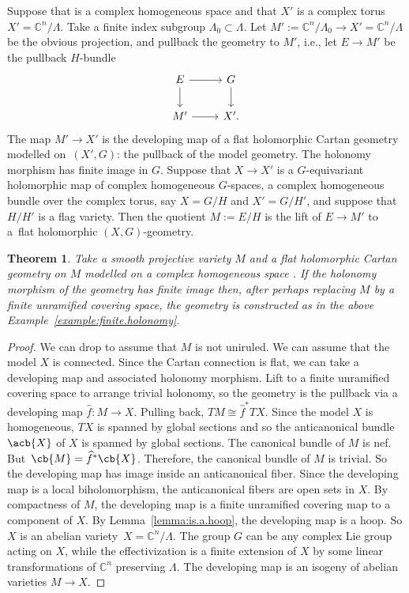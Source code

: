 \documentclass[10pt,a4paper]{amsart}
\providecommand{\C}{}
\numberwithin{equation}{section}
\newtheorem{Theorem}{Theorem}[section]
\renewcommand{\C}{\mathbb{C}}
\begin{document}
\begin{Example}\label{example:finite.holonomy}
Suppose that  is a complex homogeneous space and that $X'$ is a complex torus $X' = \C^{n}/\Lambda$.
Take a finite index subgroup $\Lambda_0 \subset \Lambda$.
Let $M' := \C^{n}/\Lambda_0 \to X' = \C^{n}/\Lambda$ be the obvious projection, and pullback the geometry to $M'$, i.e., let $E \longrightarrow
 M'$ be the pullback $H$-bundle
\[
\begin{tikzcd}
E \arrow{r}\arrow{d} & G \arrow{d} \\
M' \arrow{r} & X'.
\end{tikzcd}
\]
The map $M' \longrightarrow
 X'$ is the developing map of a flat holomorphic Cartan geometry modelled on~$(X', G)$: the pullback of the model geometry.
The holonomy morphism has finite image in $G$.
Suppose that $X \to X'$ is a $G$-equivariant holomorphic map of complex homogeneous $G$-spaces, a complex
homogeneous bundle over the complex torus, say $X = G/H$ and $X' = G/H'$, and suppose that $H/H'$ is a flag variety.
Then the quotient $M := E/H$ is the lift of $E \to M'$ to a~flat holomorphic $(X, G)$-geometry.
\end{Example}

\begin{Theorem}\label{theorem:finite.holonomy}
Take a smooth projective variety $M$ and a flat holomorphic Cartan geometry on $M$ modelled on a complex homogeneous space .
If the holonomy morphism of the geometry has finite image then, after perhaps replacing $M$ by a finite unramified covering space, the geometry is constructed as in the above Example~{\rm \ref{example:finite.holonomy}}.
\end{Theorem}

\begin{proof}
We can drop to assume that $M$ is not uniruled.
We can assume that the model $X$ is connected.
Since the Cartan connection is flat, we can take a developing map and associated holonomy morphism.
Lift to a finite unramified covering space to arrange trivial holonomy, so the geometry is the pullback via a developing map
$\widehat{f} \colon M \to X$.
Pulling back, ${TM \cong \widehat{f}^* TX}$.
Since the model $X$ is homogeneous, $TX$ is spanned by global sections and so the anticanonical bundle~$\acb{X}$ of $X$ is spanned by global sections.
The canonical bundle of $M$ is nef.
But~${\cb{M} = \widehat{f}^* \cb{X}}$.
Therefore, the canonical bundle of $M$ is trivial.
So the developing map has image inside an anticanonical fiber.
Since the developing map is a local biholomorphism, the anticanonical fibers are open sets in $X$.
By compactness of $M$, the developing map is a finite unramified covering map to a component of $X$.
By Lemma~\ref{lemma:is.a.hoop}, the developing map is a hoop.
So $X$ is an abelian variety~${X = \C^{n}/\Lambda}$.
The group $G$ can be any complex Lie group acting on $X$, while the effectivization is a finite extension of $X$ by some linear transformations of $\C^{n}$ preserving $\Lambda$.
The developing map is an isogeny of abelian varieties $M \to X$.
\end{proof}
\end{document}
